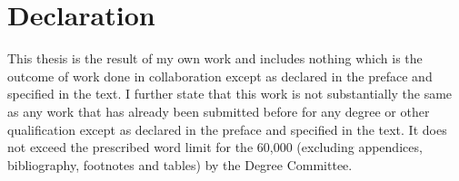 \chapter{Declaration}
This thesis is the result of my own work and includes nothing which is the outcome of work done in collaboration except as declared in the preface and specified in the text. I further state that this work is not substantially the same as any work that has already been submitted before for any degree or other qualification except as declared in the preface and specified in the text. It does not exceed the prescribed word limit for the 60,000 (excluding appendices, bibliography, footnotes and tables) by the Degree Committee.



